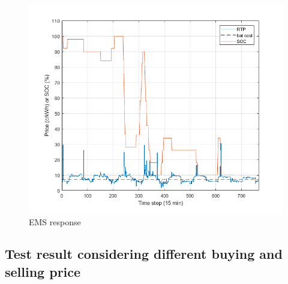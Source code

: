  \begin{figure}[!ht]
    \centering
    \includegraphics[width = \linewidth]{figs/Plot100_7.png}
    \caption{EMS response}
    \label{fig:EMS_7_7days}
\end{figure}


\subsection{Test result considering different buying and selling price}


